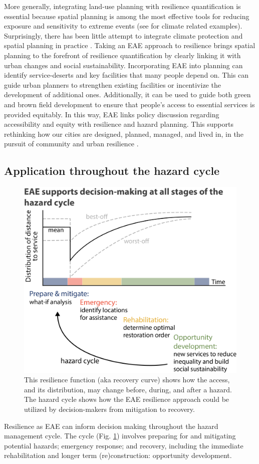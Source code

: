 \documentclass[onecolumn,doublespacing]{risa}
\let \citeA \textcite
\let \cite \parencite
\begin{document}
More generally, integrating land-use planning with resilience quantification is essential because spatial planning is among the most effective tools for reducing exposure and sensitivity to extreme events \cite{Brunetta2019-ki, Campbell2006-in, Hurlimann2012-uj, Berke2015-nv} (see \citeA{Anderson2018-hr} for climate related examples). 
Surprisingly, there has been little attempt to integrate climate protection and spatial planning in practice \cite{Barnes2017-xf}.
Taking an EAE approach to resilience brings spatial planning to the forefront of resilience quantification by clearly linking it with urban changes and social sustainability.
Incorporating EAE into planning can identify service-deserts and key facilities that many people depend on.
This can guide urban planners to strengthen existing facilities or incentivize the development of additional ones.
Additionally, it can be used to guide both green and brown field development to ensure that people's access to essential services is provided equitably.
In this way, EAE links policy discussion regarding accessibility and equity with resilience and hazard planning.
This supports rethinking how our cities are designed, planned, managed, and lived in, in the pursuit of community and urban resilience \cite{Caldarice2019-tv}. 

\subsection{Application throughout the hazard cycle}
\begin{figure}
    \centering
    \includegraphics[width=0.5\linewidth]{report/fig/hazard_cycle.png}
    \caption{This resilience function (aka recovery curve) shows how the access, and its distribution, may change before, during, and after a hazard. The hazard cycle shows how the EAE resilience approach could be utilized by decision-makers from mitigation to recovery.}
    \label{fig:haz_cycle}
\end{figure}
Resilience as EAE can inform decision making throughout the hazard management cycle. 
The cycle (Fig. \ref{fig:haz_cycle}) involves preparing for and mitigating potential hazards; emergency response; and recovery, including the immediate rehabilitation and longer term (re)construction: opportunity development.
\end{document}
